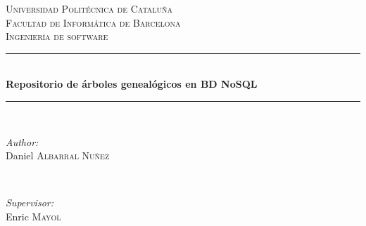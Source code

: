 \documentclass[12pt]{article} %
\begin{document}
\begin{titlepage}

\newcommand{\HRule}{\rule{\linewidth}{0.5mm}} %

\center %
 

\textsc{\LARGE Universidad Politécnica de Cataluña}\\[1.5cm] %
\textsc{\Large Facultad de Informática de Barcelona}\\[0.5cm] %
\textsc{\large Ingeniería de software}\\[0.5cm] %


\HRule \\[0.4cm]
{ \huge \bfseries Repositorio de árboles genealógicos en BD NoSQL}\\[0.4cm] %
\HRule \\[1.5cm]
 

\begin{minipage}{0.4\textwidth}
\begin{flushleft} \large
\emph{Author:}\\
Daniel \textsc{Albarral Nuñez} %
\end{flushleft}
\end{minipage}
~
\begin{minipage}{0.4\textwidth}
\begin{flushright} \large
\emph{Supervisor:} \\
Enric \textsc{Mayol} %
\end{flushright}
\end{minipage}\\[4cm]



\end{titlepage}
\end{document}
